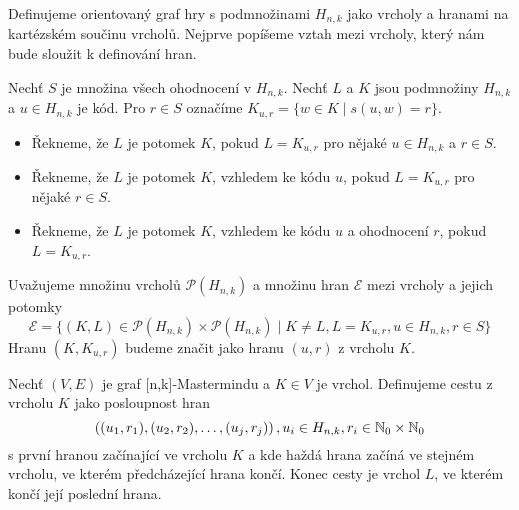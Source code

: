 Definujeme orientovaný graf hry s podmnožinami $H_{n,k}$ jako vrcholy a hranami na kartézském součinu vrcholů. Nejprve popíšeme vztah mezi vrcholy, který nám bude sloužit k definování hran.
\begin{definice}[Potomek]\label{potomek}
  Nechť $S$ je množina všech ohodnocení v $H_{n,k}$. Nechť $L$ a $K$ jsou podmnožiny $H_{n,k}$ a $ u \in H_{n,k}$ je kód. Pro $r \in S$ označíme $K_{u,r} = \{w \in K \mid s(u,w) = r\}$. 

  \begin{itemize}
      \item Řekneme, že $L$ je potomek $K$, pokud $L = K_{u,r}$ pro nějaké $u\in H_{n,k}$ a $r \in S$. 
      \item Řekneme, že $L$ je potomek $K$, vzhledem ke kódu $u$, pokud $L = K_{u,r}$ pro nějaké $r \in S$.
      \item Řekneme, že $L$ je potomek $K$, vzhledem ke kódu $u$ a ohodnocení $r$, pokud $L = K_{u,r}$.
  \end{itemize}
\end{definice}

\begin{definice}
   Uvažujeme množinu vrcholů $\mathcal{P}(H_{n,k})$ a množinu hran $\mathcal{E}$ mezi vrcholy a jejich potomky
  \[\mathcal{E} = \{(K, L) \in \mathcal{P}(H_{n,k}) \times \mathcal{P}(H_{n,k}) \mid K \neq L, L = K_{u,r}, u \in H_{n,k}, r\in S\}\]
  Hranu $(K, K_{u,r})$ budeme značit jako hranu $(u,r)$ z vrcholu $K$.
\end{definice}



\begin{definice}\label{cesta}
    Nechť $(V, E)$ je graf [n,k]-Mastermindu a $K \in V$ je vrchol. Definujeme cestu z vrcholu $K$ jako posloupnost hran 
    \[\left((u_1, r_1), (u_2,r_2), \dots, (u_j,r_j)\right), u_i \in H_{n,k}, r_i \in \mathbb{N} _0 \times \mathbb{N} _0\]
    s první hranou začínající ve vrcholu $K$ a kde haždá hrana začíná ve stejném vrcholu, ve kterém předcházející hrana končí. Konec cesty je vrchol $L$, ve kterém končí její poslední hrana. 
\end{definice}

